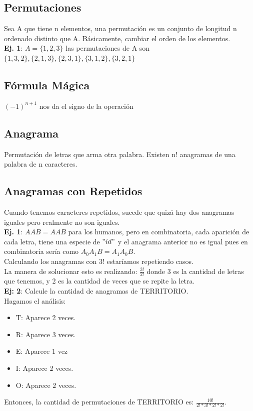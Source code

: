 \documentclass[10pt,a4paper]{article}
\begin{document}
\subsection*{Permutaciones}
Sea A que tiene n elementos, una permutación es un conjunto de longitud n ordenado distinto que A. Básicamente, cambiar el orden de los elementos. \\
\textbf{Ej. 1}: $ A = \{1, 2, 3\}$ las permutaciones de A son $\{1, 3, 2\}, \{2, 1, 3\}, \{2, 3, 1\}, \{3, 1, 2\}, \{3, 2, 1\}$ 
\subsection*{Fórmula Mágica}
$(-1)^{n+1}$ nos da el signo de la operación
\subsection*{Anagrama}
Permutación de letras que arma otra palabra. Existen n! anagramas de una palabra de n caracteres.
\subsection*{Anagramas con Repetidos}
Cuando tenemos caracteres repetidos, sucede que quizá hay dos anagramas iguales pero realmente no son iguales. \\
\textbf{Ej. 1}: $AAB = AAB$ para los humanos, pero en combinatoria, cada aparición de cada letra, tiene una especie de $"id"$ y el anagrama anterior no es igual pues en combinatoria sería como $A_{0}A_{1}B = A_{1}A_{0}B$. \\  Calculando los anagramas con 3! estaríamos repetiendo casos. \\
La manera de solucionar esto es realizando: $\frac{3!}{2!}$ donde 3 es la cantidad de letras que tenemos, y 2 es la cantidad de veces que se repite la letra. \\
\textbf{Ej: 2}: Calcule la cantidad de anagramas de TERRITORIO.  \\
Hagamos el análisis: 
\begin{itemize}
    \item T: Aparece 2 veces.
    \item R: Aparece 3 veces.
    \item E: Aparece 1 vez 
    \item I: Aparece 2 veces.
    \item O: Aparece 2 veces.
\end{itemize}
Entonces, la cantidad de permutaciones de TERRITORIO es: $\frac{10!}{2! \ast 3! \ast 2! \ast 2!}$. 
\end{document}
